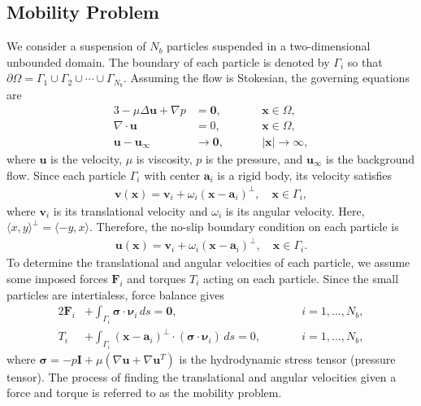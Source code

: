 \documentclass[lineno]{jfm}
\renewcommand{\aa}{\mathbf{a}}
\newcommand{\bd}{\partial}
\newcommand{\FF}{\mathbf{F}}
\newcommand{\nnu}{\boldsymbol{\nu}}
\newcommand{\ssigma}{\boldsymbol{\sigma}}
\newcommand{\xx}{\mathbf{x}}
\newcommand{\uu}{\mathbf{u}}
\renewcommand{\vv}{\mathbf{v}}
\begin{document}
\subsection{\label{mobility}Mobility Problem}
We consider a suspension of $N_b$ particles suspended in a
two-dimensional unbounded domain. The boundary of each particle is
denoted by $\Gamma_i$ so that $\bd \Omega = \Gamma_1 \cup \Gamma_2 \cup
\cdots \cup \Gamma_{N_b}$. Assuming the flow is Stokesian, the governing
equations are
\begin{alignat}{3}
  -\mu \Delta \uu + \nabla p &= \mathbf{0}, 
    && \xx \in \Omega, \\
  \nabla\cdot \uu &= 0, \qquad && \xx \in \Omega, \\
  \uu - \uu_\infty &\to \mathbf{0}, && |\xx| \to \infty,
\end{alignat}
%
where $\uu$ is the velocity, $\mu$ is viscosity, $p$ is the pressure,
and $\uu_\infty$ is the background flow. Since each particle $\Gamma_i$
with center $\aa_i$ is a rigid body, its velocity satisfies 
\begin{align}
  \vv(\xx) = \vv_i + \omega_i (\xx - \aa_i)^\perp, \quad 
    \xx \in \Gamma_i,
\end{align}
where $\vv_i$ is its translational velocity and $\omega_i$ is its
angular velocity. Here, $\langle x, y \rangle^{\perp} = \langle -y, x
\rangle$. Therefore, the no-slip boundary condition on each particle is
\begin{align}
  \uu(\xx) = \vv_i + \omega_i (\xx - \aa_i)^\perp, \quad
    \xx \in \Gamma_i.
\end{align}
To determine the translational and angular velocities of each particle,
we assume some imposed forces $\FF_i$ and torques $T_i$ acting on each
particle. Since the small particles are intertialess, force balance
gives 
\begin{alignat}{2}
  \label{eqn:force}
  \FF_i &+ \int_{\Gamma_i} \ssigma \cdot \nnu_i \, ds = \mathbf{0},
  && i=1,\ldots,N_b,\\
  \label{eqn:torque}
  T_i &+ \int_{\Gamma_i} (\xx - \aa_i)^\perp \cdot 
    (\ssigma \cdot \nnu_i) \, ds = 0, \qquad && i=1,\ldots,N_b,
\end{alignat}
where $\ssigma = -p \mathbf{I} + \mu \left(\nabla \uu + \nabla \uu^T
\right)$ is the hydrodynamic stress tensor (pressure tensor). The
process of finding the translational and angular velocities given a
force and torque is referred to as the mobility problem.
\end{document}

